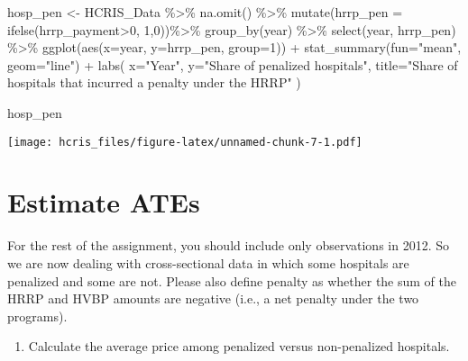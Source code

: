 \documentclass[
]{article}
\newenvironment{Shaded}{\begin{snugshade}}{\end{snugshade}}
\newcommand{\AttributeTok}[1]{\textcolor[rgb]{0.77,0.63,0.00}{#1}}
\newcommand{\DecValTok}[1]{\textcolor[rgb]{0.00,0.00,0.81}{#1}}
\newcommand{\FunctionTok}[1]{\textcolor[rgb]{0.00,0.00,0.00}{#1}}
\newcommand{\NormalTok}[1]{#1}
\newcommand{\OtherTok}[1]{\textcolor[rgb]{0.56,0.35,0.01}{#1}}
\newcommand{\SpecialCharTok}[1]{\textcolor[rgb]{0.00,0.00,0.00}{#1}}
\newcommand{\StringTok}[1]{\textcolor[rgb]{0.31,0.60,0.02}{#1}}
\providecommand{\tightlist}{%
  \setlength{\itemsep}{0pt}\setlength{\parskip}{0pt}}
\begin{document}
\begin{Shaded}
\begin{Highlighting}[]
\NormalTok{hosp\_pen }\OtherTok{\textless{}{-}}\NormalTok{ HCRIS\_Data }\SpecialCharTok{\%\textgreater{}\%}
  \FunctionTok{na.omit}\NormalTok{() }\SpecialCharTok{\%\textgreater{}\%}
  \FunctionTok{mutate}\NormalTok{(}\AttributeTok{hrrp\_pen =} \FunctionTok{ifelse}\NormalTok{(hrrp\_payment}\SpecialCharTok{\textgreater{}}\DecValTok{0}\NormalTok{, }\DecValTok{1}\NormalTok{,}\DecValTok{0}\NormalTok{))}\SpecialCharTok{\%\textgreater{}\%}
  \FunctionTok{group\_by}\NormalTok{(year) }\SpecialCharTok{\%\textgreater{}\%}
  \FunctionTok{select}\NormalTok{(year, hrrp\_pen) }\SpecialCharTok{\%\textgreater{}\%}
  \FunctionTok{ggplot}\NormalTok{(}\FunctionTok{aes}\NormalTok{(}\AttributeTok{x=}\NormalTok{year, }\AttributeTok{y=}\NormalTok{hrrp\_pen, }\AttributeTok{group=}\DecValTok{1}\NormalTok{)) }\SpecialCharTok{+}
  \FunctionTok{stat\_summary}\NormalTok{(}\AttributeTok{fun=}\StringTok{"mean"}\NormalTok{, }\AttributeTok{geom=}\StringTok{"line"}\NormalTok{) }\SpecialCharTok{+}
  \FunctionTok{labs}\NormalTok{(}
    \AttributeTok{x=}\StringTok{"Year"}\NormalTok{,}
    \AttributeTok{y=}\StringTok{"Share of penalized hospitals"}\NormalTok{,}
    \AttributeTok{title=}\StringTok{"Share of hospitals that incurred a penalty under the HRRP"}
\NormalTok{  )}

\NormalTok{hosp\_pen}
\end{Highlighting}
\end{Shaded}

\texttt{[image: hcris\_files/figure-latex/unnamed-chunk-7-1.pdf]}

\hypertarget{estimate-ates}{%
\section{Estimate ATEs}\label{estimate-ates}}

For the rest of the assignment, you should include only observations in
2012. So we are now dealing with cross-sectional data in which some
hospitals are penalized and some are not. Please also define penalty as
whether the sum of the HRRP and HVBP amounts are negative (i.e., a net
penalty under the two programs).

\begin{enumerate}
\def\labelenumi{\arabic{enumi}.}
\tightlist
\item
  Calculate the average price among penalized versus non-penalized
  hospitals.
\end{enumerate}
\end{document}
